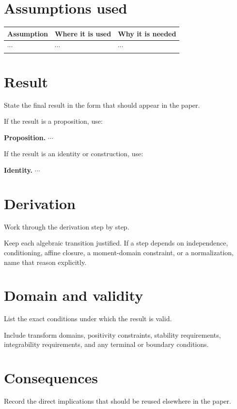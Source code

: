 \documentclass[11pt]{article}
\begin{document}
\section{Assumptions used}

\begin{tabularx}{\textwidth}{XXX}
\toprule
Assumption & Where it is used & Why it is needed\\
\midrule
\(\cdots\) & \(\cdots\) & \(\cdots\)\\
\bottomrule
\end{tabularx}

\section{Result}

State the final result in the form that should appear in the paper.

If the result is a proposition, use:

\medskip
\noindent\textbf{Proposition.} \(\cdots\)

\medskip
If the result is an identity or construction, use:

\medskip
\noindent\textbf{Identity.} \(\cdots\)

\section{Derivation}

Work through the derivation step by step.

Keep each algebraic transition justified.
If a step depends on independence, conditioning, affine closure, a
moment-domain constraint, or a normalization, name that reason explicitly.

\section{Domain and validity}

List the exact conditions under which the result is valid.

Include transform domains, positivity constraints, stability requirements,
integrability requirements, and any terminal or boundary conditions.

\section{Consequences}

Record the direct implications that should be reused elsewhere in the paper.
\end{document}
